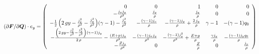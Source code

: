 \begin{equation}
\left( \partial \bm{F}/\partial \bm{Q}\right) \cdot e_y = \left(\begin{array}{rrrrr}
0 & 0 & 1 & 0 & 0 \\
-\frac{j_{x} j_{y}}{\rho^{2}} & \frac{j_{y}}{\rho} & \frac{j_{x}}{\rho} & 0 & 0 \\
-\frac{1}{2} \, {\left(2 \, g y - \frac{j_{x}^{2}}{\rho^{2}} - \frac{j_{y}^{2}}{\rho^{2}}\right)} {\left(\gamma - 1\right)} - \frac{j_{y}^{2}}{\rho^{2}} & -\frac{{\left(\gamma - 1\right)} j_{x}}{\rho} & -\frac{{\left(\gamma - 1\right)} j_{y}}{\rho} + \frac{2 \, j_{y}}{\rho} & \gamma - 1 & -{\left(\gamma - 1\right)} q_{0} \\
-\frac{{\left(2 \, g y - \frac{j_{x}^{2}}{\rho^{2}} - \frac{j_{y}^{2}}{\rho^{2}}\right)} {\left(\gamma - 1\right)} j_{y}}{2 \, \rho} - \frac{{\left(E + {p}\right)} j_{y}}{\rho^{2}} & -\frac{{\left(\gamma - 1\right)} j_{x} j_{y}}{\rho^{2}} & -\frac{{\left(\gamma - 1\right)} j_{y}^{2}}{\rho^{2}} + \frac{E + {p}}{\rho} & \frac{\gamma j_{y}}{\rho} & -\frac{{\left(\gamma - 1\right)} j_{y} q_{0}}{\rho} \\
-\frac{Z j_{y}}{\rho^{2}} & 0 & \frac{Z}{\rho} & 0 & \frac{j_{y}}{\rho}
\end{array}\right)
\end{equation}


